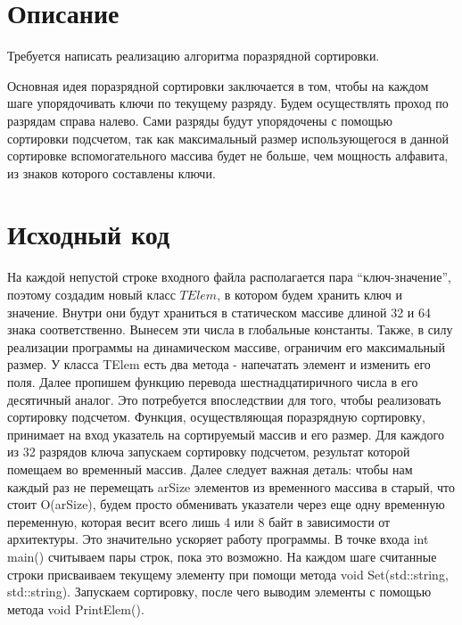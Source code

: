 \section{Описание}
Требуется написать реализацию алгоритма поразрядной сортировки. 

Основная идея поразрядной сортировки заключается в том, чтобы на каждом шаге упорядочивать ключи по текущему разряду. Будем осуществлять проход по разрядам справа налево. Сами разряды будут упорядочены с помощью сортировки подсчетом, так как максимальный размер использующегося в данной сортировке вспомогательного массива будет не больше, чем мощность алфавита, из знаков которого составлены ключи. 

\pagebreak

\section{Исходный код}

На каждой непустой строке входного файла располагается пара \enquote{ключ-значение}, поэтому создадим новый 
класс $TElem$, в котором будем хранить ключ и значение.
Внутри они будут храниться в статическом массиве длиной 32 и 64 знака соответственно. Вынесем эти числа в глобальные константы. Также, в силу реализации программы на динамическом массиве, ограничим его максимальный размер. У класса TElem есть два метода - напечатать элемент и изменить его поля. 
Далее пропишем функцию перевода шестнадцатиричного числа в его десятичный аналог. Это потребуется впоследствии для того, чтобы реализовать сортировку подсчетом. 
Функция, осуществляющая поразрядную сортировку, принимает на вход указатель на сортируемый массив и его размер.
Для каждого из 32 разрядов ключа запускаем сортировку подсчетом, результат которой помещаем во временный массив. Далее следует важная деталь: чтобы нам каждый раз не перемещать arSize элементов из временного массива в старый, что стоит O(arSize), будем просто обменивать указатели через еще одну временную переменную, которая весит всего лишь 4 или 8 байт в зависимости от архитектуры. Это значительно ускоряет работу программы.  
В точке входа int main() считываем пары строк, пока это возможно. На каждом шаге считанные строки присваиваем текущему элементу при помощи метода void Set(std::string, std::string). Запускаем сортировку, после чего выводим элементы с помощью метода void PrintElem().
\pagebreak

